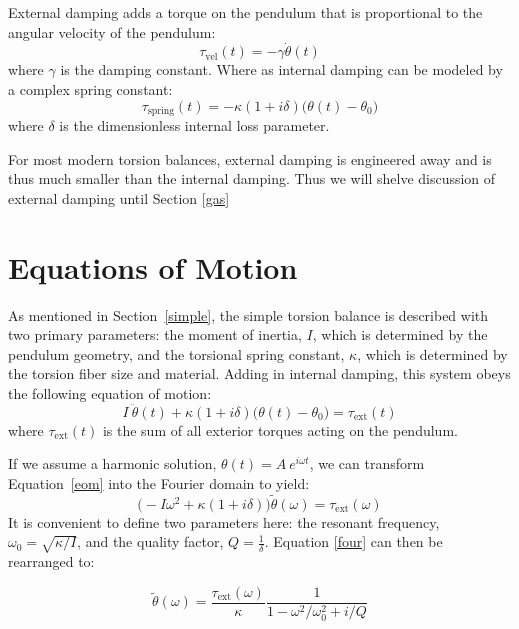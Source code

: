\documentclass{book}
\begin{document}
External damping adds a torque on the pendulum that is proportional to the angular velocity of the pendulum:
\begin{equation}
\tau_{\text{vel}}(t) = -\gamma \dot{\theta}(t)
\end{equation}
where $\gamma$ is the damping constant. Where as internal damping can be modeled by a complex spring constant:
\begin{equation}
\tau_{\text{spring}}(t) =  -\kappa(1+i\delta) \big(\theta(t)-\theta_0\big)
\end{equation}
where $\delta$ is the dimensionless internal loss parameter.

For most modern torsion balances, external damping is engineered away and is thus much smaller than the internal damping. Thus we will shelve discussion of external damping until Section \ref{gas}

\section{Equations of Motion}

\quad As mentioned in Section~\ref{simple}, the simple torsion balance is described with two primary parameters: the moment of inertia, $I$, which is determined by the pendulum geometry, and the torsional spring constant, $\kappa$, which is determined by the torsion fiber size and material. Adding in internal damping, this system obeys the following equation of motion:
\begin{equation}
I~\ddot{\theta}(t)+\kappa(1+i\delta)  \big(\theta(t)-\theta_0\big) = \tau_{\text{ext}}(t) \label{eom}
\end{equation}
where $\tau_{\text{ext}}(t)$ is the sum of all exterior torques acting on the pendulum.

If we assume a harmonic solution, $\theta(t)=A~e^{i\omega t}$, we can transform Equation~\ref{eom} into the Fourier domain to yield:
\begin{equation}
\big(-I\omega^2+\kappa(1+i\delta) \big) \tilde{\theta}(\omega)= \tau_{\text{ext}}(\omega) \label{four}
\end{equation}
It is convenient to define two parameters here: the resonant frequency, $\omega_0=\sqrt{\kappa/I}$, and the quality factor, $Q=\frac{1}{\delta}$. Equation \ref{four} can then be rearranged to:

\begin{equation}
 \tilde{\theta}(\omega)= \frac{\tau_{\text{ext}}(\omega)}{\kappa}\frac{1}{1-\omega^2/\omega_0^2 +i/Q} \label{four2}
\end{equation}
\end{document}
